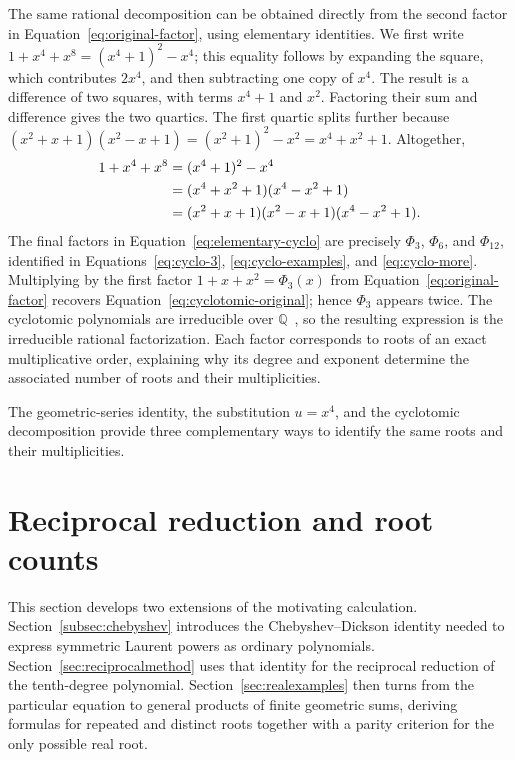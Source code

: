 \documentclass[11pt,a4paper]{article}
\numberwithin{equation}{section}
\theoremstyle{uprightpaper}
\newcommand{\Q}{\mathbb{Q}}
\begin{document}
The same rational decomposition can be obtained directly from the
second factor in Equation~\eqref{eq:original-factor}, using elementary
identities. We first write $1+x^4+x^8=(x^4+1)^2-x^4$;
this equality follows by expanding the square, which contributes
$2x^4$, and then subtracting one copy of $x^4$. The result is a
difference of two squares, with terms $x^4+1$ and $x^2$.
Factoring their sum and difference gives the two quartics.
The first quartic splits further because
$(x^2+x+1)(x^2-x+1)=(x^2+1)^2-x^2=x^4+x^2+1$.
Altogether,
\begin{align}
 1+x^4+x^8
 &= (x^4+1)^2-x^4\notag\\
 &= (x^4+x^2+1)(x^4-x^2+1)\notag\\
 &= (x^2+x+1)(x^2-x+1)(x^4-x^2+1).\label{eq:elementary-cyclo}
\end{align}
The final factors in Equation~\eqref{eq:elementary-cyclo} are precisely
$\Phi_3$, $\Phi_6$, and $\Phi_{12}$, identified in
Equations~\eqref{eq:cyclo-3}, \eqref{eq:cyclo-examples}, and
\eqref{eq:cyclo-more}. Multiplying by the first factor
$1+x+x^2=\Phi_3(x)$ from Equation~\eqref{eq:original-factor}
recovers Equation~\eqref{eq:cyclotomic-original}; hence $\Phi_3$
appears twice. The cyclotomic polynomials are irreducible over
$\Q$~\cite[Section~13.6]{dummit2004}, so the resulting expression
is the irreducible rational factorization. Each factor corresponds
to roots of an exact multiplicative order, explaining why its degree
and exponent determine the associated number of roots and their
multiplicities.

The geometric-series identity, the substitution $u=x^4$, and the cyclotomic decomposition provide three complementary ways to identify the same roots and their multiplicities.


\section{Reciprocal reduction and root counts}\label{sec:chebyshev-applications}

This section develops two extensions of the motivating calculation. Section~\ref{subsec:chebyshev} introduces the Chebyshev--Dickson identity needed to express symmetric Laurent powers as ordinary polynomials. Section~\ref{sec:reciprocalmethod} uses that identity for the reciprocal reduction of the tenth-degree polynomial. Section~\ref{sec:realexamples} then turns from the particular equation to general products of finite geometric sums, deriving formulas for repeated and distinct roots together with a parity criterion for the only possible real root.
\end{document}
